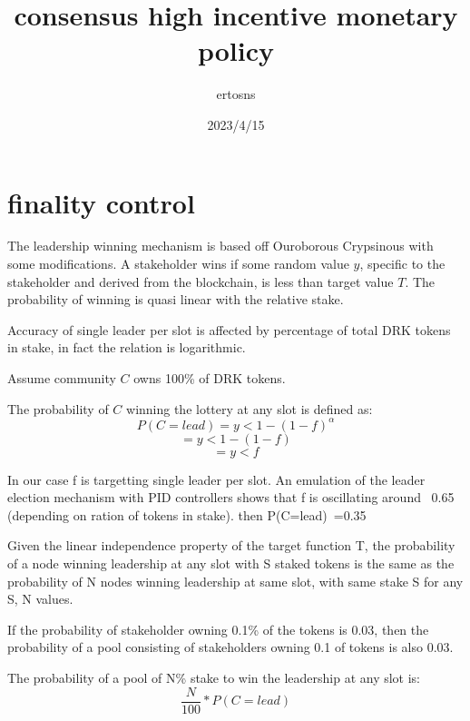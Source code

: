 \documentclass{article}
\begin{document}
\title {consensus high incentive monetary policy}
\author {ertosns}
\date {2023/4/15}
\maketitle


\section{finality control}

\begin{description}
\item The leadership winning mechanism is based off Ouroborous Crypsinous
with some modifications. A stakeholder wins if some random value $y$,
specific to the stakeholder and derived from the blockchain, is less
than target value $T$. The probability of winning is quasi linear with
the relative stake.

\item Accuracy of single leader per slot is affected by percentage of total
DRK tokens in stake, in fact the relation is logarithmic.

\item Assume community $C$ owns 100\% of DRK tokens.

\item The probability of $C$ winning the lottery at any slot is defined as:
  $$P(C=lead) = y < 1 -(1-f)^\alpha $$
  $$= y < 1 -(1-f) $$
  $$= y < f$$

\item In our case f is targetting single leader per slot. An emulation of
the leader election mechanism with PID controllers shows that f is
oscillating around ~0.65 (depending on ration of tokens in stake). then P(C=lead)~=0.35


\item Given the linear independence property of the target function T, the
probability of a node winning leadership at any slot with S staked tokens
is the same as the probability of N nodes winning leadership at same slot,
with same stake S for any S, N values.

\item If the probability of stakeholder owning 0.1\% of the tokens is 0.03,
then the probability of a pool consisting of stakeholders owning 0.1%
of tokens is also 0.03.

\item The probability of a pool of N\% stake to win the leadership at any slot is: $$ \frac{N}{100}*P(C=lead)$$




\end{description}
\end{document}
